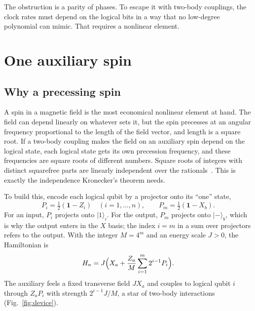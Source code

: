 \documentclass[11pt,a4paper]{article}
\providecommand{\openone}{\mathbf{1}}
\newcommand{\ket}[1]{\lvert #1\rangle}
\newcommand{\id}{\openone}
\begin{document}
The obstruction is a parity of phases. To escape it with two-body couplings, the clock rates must depend on the logical bits in a way that no low-degree polynomial can mimic. That requires a nonlinear element.

\section{One auxiliary spin}
\label{sec:existence}

\subsection{Why a precessing spin}

A spin in a magnetic field is the most economical nonlinear element at hand. The field can depend linearly on whatever sets it, but the spin precesses at an angular frequency proportional to the length of the field vector, and length is a square root. If a two-body coupling makes the field on an auxiliary spin depend on the logical state, each logical state gets its own precession frequency, and these frequencies are square roots of different numbers. Square roots of integers with distinct squarefree parts are linearly independent over the rationals~\cite{Besicovitch1940}. This is exactly the independence Kronecker's theorem needs.

To build this, encode each logical qubit by a projector onto its ``one'' state,
\begin{equation}
 P_i=\tfrac12(\id-Z_i)\quad (i=1,\ldots,n),\qquad
 P_m=\tfrac12(\id-X_b).
\end{equation}
For an input, $P_i$ projects onto $\ket1_i$. For the output, $P_m$ projects onto $\ket-_b$, which is why the output enters in the $X$ basis; the index $i=m$ in a sum over projectors refers to the output. With the integer $M=4^m$ and an energy scale $J>0$, the Hamiltonian is
\begin{equation}
 H_n=J\Bigl(X_a+\frac{Z_a}{M}\sum_{i=1}^{m}2^{i-1}P_i\Bigr).
 \label{eq:hamiltonian}
\end{equation}
The auxiliary feels a fixed transverse field $JX_a$ and couples to logical qubit $i$ through $Z_aP_i$ with strength $2^{i-1}J/M$, a star of two-body interactions (Fig.~\ref{fig:device}).
\end{document}
